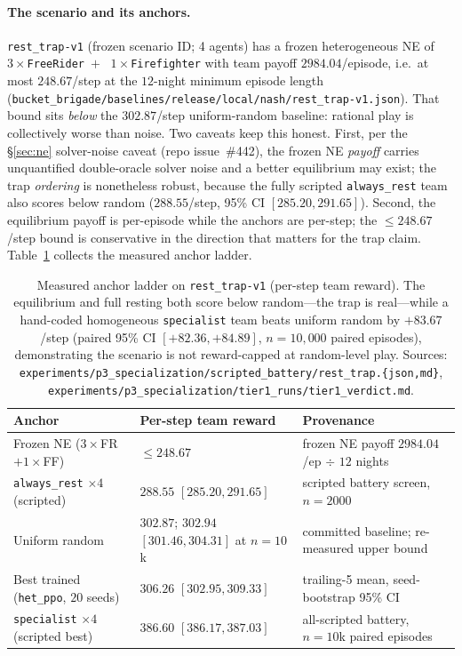 \documentclass{anvil-paper}
\begin{document}
\paragraph{The scenario and its anchors.}
\texttt{rest\_trap-v1} (frozen scenario ID; 4 agents) has a frozen
heterogeneous NE of $3{\times}$\texttt{FreeRider}~$+$~%
$1{\times}$\texttt{Firefighter} with team payoff $2984.04$/episode,
i.e.\ at most $248.67$/step at the $12$-night minimum episode length
(\texttt{bucket\_brigade/baselines/release/local/nash/rest\_trap-v1.json}).
That bound sits \emph{below} the $302.87$/step uniform-random baseline:
rational play is collectively worse than noise. Two caveats keep this
honest. First, per the \S\ref{sec:ne} solver-noise caveat (repo
issue~\#442), the frozen NE \emph{payoff} carries unquantified
double-oracle solver noise and a better equilibrium may exist; the trap
\emph{ordering} is nonetheless robust, because the fully scripted
\texttt{always\_rest} team also scores below random
($288.55$/step, 95\% CI $[285.20, 291.65]$). Second, the equilibrium
payoff is per-episode while the anchors are per-step; the
$\leq 248.67$/step bound is conservative in the direction that matters
for the trap claim. Table~\ref{tab:trap-anchors} collects the measured
anchor ladder.

\begin{table}[h]
  \centering
  \small
  \setlength{\tabcolsep}{5pt}
  \begin{tabular}{lll}
    \toprule
    Anchor & Per-step team reward & Provenance \\
    \midrule
    Frozen NE ($3{\times}$FR$+1{\times}$FF) & $\leq 248.67$
      & frozen NE payoff $2984.04$/ep $\div$ $12$ nights \\
    \texttt{always\_rest} $\times 4$ (scripted) & $288.55$ $[285.20, 291.65]$
      & scripted battery screen, $n{=}2000$ \\
    Uniform random & $302.87$; $302.94$ $[301.46, 304.31]$ at $n{=}10$k
      & committed baseline; re-measured upper bound \\
    Best trained (\texttt{het\_ppo}, $20$ seeds) & $306.26$ $[302.95, 309.33]$
      & trailing-5 mean, seed-bootstrap 95\% CI \\
    \texttt{specialist} $\times 4$ (scripted best) & $\mathbf{386.60}$ $[386.17, 387.03]$
      & all-scripted battery, $n{=}10$k paired episodes \\
    \bottomrule
  \end{tabular}
  \caption{Measured anchor ladder on \texttt{rest\_trap-v1} (per-step
  team reward). The equilibrium and full resting both score below
  random---the trap is real---while a hand-coded homogeneous
  \texttt{specialist} team beats uniform random by $+83.67$/step
  (paired 95\% CI $[+82.36, +84.89]$, $n{=}10{,}000$ paired episodes),
  demonstrating the scenario is not reward-capped at random-level play.
  Sources:
  \texttt{experiments/p3\_specialization/scripted\_battery/rest\_trap.\{json,md\}},
  \texttt{experiments/p3\_specialization/tier1\_runs/tier1\_verdict.md}.}
  \label{tab:trap-anchors}
\end{table}
\end{document}
